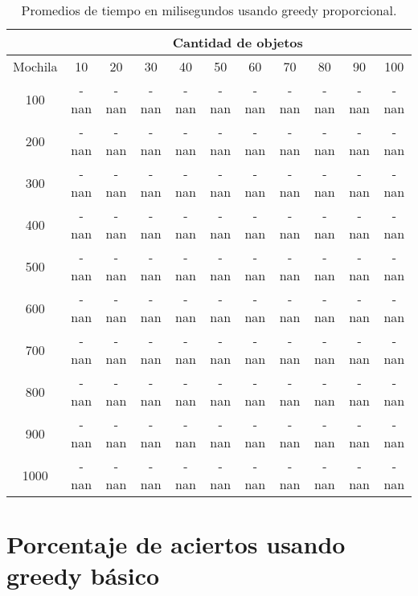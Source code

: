 \documentclass[a4paper]{article}
\begin{document}
\begin{table}[H]
\centering
\relax
\resizebox{\textwidth}{!} {%
\begin{tabular}{|c|c|c|c|c|c|c|c|c|c|c|}
\cline{2-11}
 \multicolumn{1}{c}{} & \multicolumn{10}{|c|}{\textbf{Cantidad de objetos}} \\
\hline
Mochila & 10 & 20 & 30 & 40 & 50 & 60 & 70 & 80 & 90 & 100 \\
\hline
\hline
100 & -nan & -nan & -nan & -nan & -nan & -nan & -nan & -nan & -nan & -nan \\
\hline
\hline
200 & -nan & -nan & -nan & -nan & -nan & -nan & -nan & -nan & -nan & -nan \\
\hline
\hline
300 & -nan & -nan & -nan & -nan & -nan & -nan & -nan & -nan & -nan & -nan \\
\hline
\hline
400 & -nan & -nan & -nan & -nan & -nan & -nan & -nan & -nan & -nan & -nan \\
\hline
\hline
500 & -nan & -nan & -nan & -nan & -nan & -nan & -nan & -nan & -nan & -nan \\
\hline
\hline
600 & -nan & -nan & -nan & -nan & -nan & -nan & -nan & -nan & -nan & -nan \\
\hline
\hline
700 & -nan & -nan & -nan & -nan & -nan & -nan & -nan & -nan & -nan & -nan \\
\hline
\hline
800 & -nan & -nan & -nan & -nan & -nan & -nan & -nan & -nan & -nan & -nan \\
\hline
\hline
900 & -nan & -nan & -nan & -nan & -nan & -nan & -nan & -nan & -nan & -nan \\
\hline
\hline
1000 & -nan & -nan & -nan & -nan & -nan & -nan & -nan & -nan & -nan & -nan \\
\hline
\end{tabular}%
}
\caption{Promedios de tiempo en milisegundos usando greedy proporcional.}
\end{table}
\section{Porcentaje de aciertos usando greedy básico}
\end{document}
